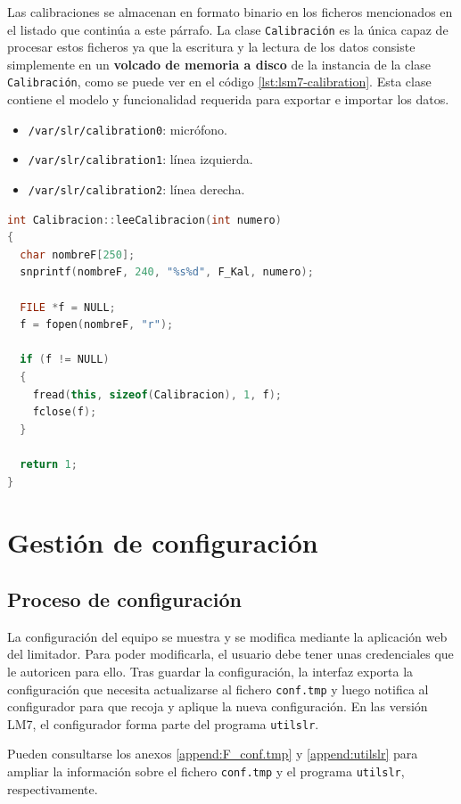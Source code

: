 Las calibraciones se almacenan en formato binario en los ficheros mencionados en el listado que continúa a este párrafo. La clase \verb|Calibración| es la única capaz de procesar estos ficheros ya que la escritura y la lectura de los datos consiste simplemente en un \textbf{volcado de memoria a disco} de la instancia de la clase \verb|Calibración|, como se puede ver en el código  \ref{lst:lsm7-calibration}. Esta clase contiene el modelo y funcionalidad requerida para exportar e importar los datos.
\begin{itemize}
	 \item \verb|/var/slr/calibration0|: micrófono.
	 \item \verb|/var/slr/calibration1|: línea izquierda.
	 \item \verb|/var/slr/calibration2|: línea derecha.
\end{itemize}

\begin{lstlisting}[language=c++, label={lst:lsm7-calibration}, caption={Lectura de calibración desde fichero.}]
int Calibracion::leeCalibracion(int numero)
{
  char nombreF[250];
  snprintf(nombreF, 240, "%s%d", F_Kal, numero);

  FILE *f = NULL;
  f = fopen(nombreF, "r");

  if (f != NULL)
  {
    fread(this, sizeof(Calibracion), 1, f);
    fclose(f);
  }

  return 1;
}
\end{lstlisting}

\clearpage
\section{Gestión de configuración} \label{sec:lms7-config}

\subsection{Proceso de configuración}

La configuración del equipo se muestra y se modifica mediante la aplicación web del limitador. Para poder modificarla, el usuario debe tener unas credenciales que le autoricen para ello. Tras guardar la configuración, la interfaz exporta la configuración que necesita actualizarse al fichero \verb|conf.tmp| y luego notifica al configurador para que recoja y aplique la nueva configuración. En las versión LM7, el configurador forma parte del programa \verb|utilslr|.

Pueden consultarse los anexos \ref{append:F_conf.tmp} y \ref{append:utilslr} para ampliar la información sobre el fichero \verb|conf.tmp| y el programa \verb|utilslr|, respectivamente.


